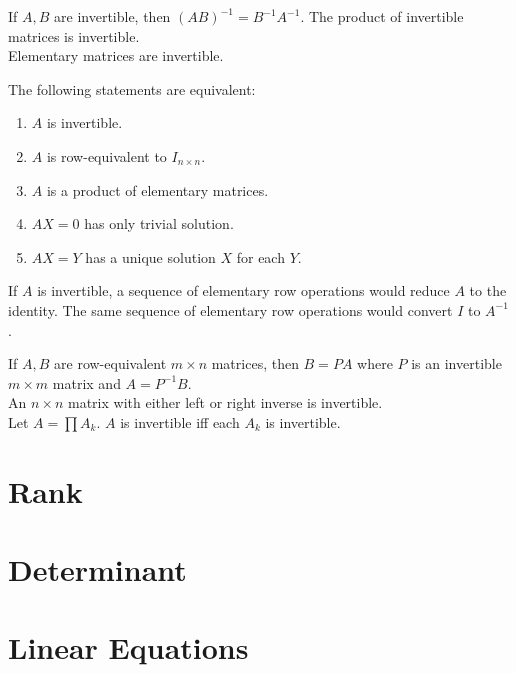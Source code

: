 	\begin{theorem}
		If $A,B$ are invertible, then $(AB)^{-1} = B^{-1}A^{-1}$. The product of invertible matrices is invertible.\\
		Elementary matrices are invertible.
	\end{theorem}
	\begin{theorem}
		The following statements are equivalent:
		\begin{enumerate}
			\item $A$ is invertible.
			\item $A$ is row-equivalent to $I_{n \times n}$.
			\item $A$ is a product of elementary matrices.
			\item $AX=0$ has only trivial solution.
			\item $AX=Y$ has a unique solution $X$ for each $Y$.
		\end{enumerate}
	\end{theorem}
	\begin{corollary}
		If $A$ is invertible, a sequence of elementary row operations would reduce $A$ to the identity. The same sequence of elementary row operations would convert $I$ to $A^{-1}$.
	\end{corollary}
	\begin{corollary}
		If $A,B$ are row-equivalent $m \times n$ matrices, then $B = PA$ where $P$ is an invertible $m \times m$ matrix and $A = P^{-1}B$.\\
		An $n \times n$ matrix with either left or right inverse is invertible.\\
		Let $A = \prod A_k$. $A$ is invertible iff each $A_k$ is invertible.
	\end{corollary}
\section{Rank}
\section{Determinant}
\section{Linear Equations}
